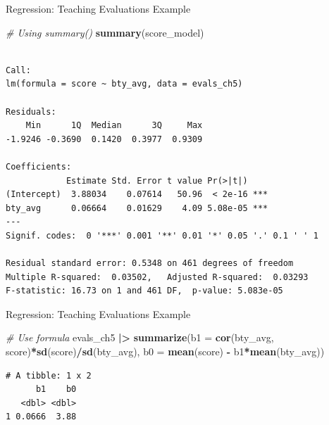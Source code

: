 \documentclass[
  ignorenonframetext,
]{beamer}
\newenvironment{Shaded}{\begin{snugshade}}{\end{snugshade}}
\newcommand{\AttributeTok}[1]{\textcolor[rgb]{0.13,0.29,0.53}{#1}}
\newcommand{\CommentTok}[1]{\textcolor[rgb]{0.56,0.35,0.01}{\textit{#1}}}
\newcommand{\FunctionTok}[1]{\textcolor[rgb]{0.13,0.29,0.53}{\textbf{#1}}}
\newcommand{\NormalTok}[1]{#1}
\newcommand{\SpecialCharTok}[1]{\textcolor[rgb]{0.81,0.36,0.00}{\textbf{#1}}}
\begin{document}
\begin{frame}[fragile]{Regression: Teaching Evaluations Example}
\protect{}\label{regression-teaching-evaluations-example-3}
\small

\begin{Shaded}
\begin{Highlighting}[]
\CommentTok{\# Using summary()}
\FunctionTok{summary}\NormalTok{(score\_model)}
\end{Highlighting}
\end{Shaded}

\begin{verbatim}

Call:
lm(formula = score ~ bty_avg, data = evals_ch5)

Residuals:
    Min      1Q  Median      3Q     Max 
-1.9246 -0.3690  0.1420  0.3977  0.9309 

Coefficients:
            Estimate Std. Error t value Pr(>|t|)    
(Intercept)  3.88034    0.07614   50.96  < 2e-16 ***
bty_avg      0.06664    0.01629    4.09 5.08e-05 ***
---
Signif. codes:  0 '***' 0.001 '**' 0.01 '*' 0.05 '.' 0.1 ' ' 1

Residual standard error: 0.5348 on 461 degrees of freedom
Multiple R-squared:  0.03502,   Adjusted R-squared:  0.03293 
F-statistic: 16.73 on 1 and 461 DF,  p-value: 5.083e-05
\end{verbatim}
\end{frame}

\begin{frame}[fragile]{Regression: Teaching Evaluations Example}
\protect{}\label{regression-teaching-evaluations-example-4}
\small

\begin{Shaded}
\begin{Highlighting}[]
\CommentTok{\# Use formula}
\NormalTok{evals\_ch5 }\SpecialCharTok{|\textgreater{}} 
  \FunctionTok{summarize}\NormalTok{(}\AttributeTok{b1 =} \FunctionTok{cor}\NormalTok{(bty\_avg, score)}\SpecialCharTok{*}\FunctionTok{sd}\NormalTok{(score)}\SpecialCharTok{/}\FunctionTok{sd}\NormalTok{(bty\_avg),}
            \AttributeTok{b0 =} \FunctionTok{mean}\NormalTok{(score) }\SpecialCharTok{{-}}\NormalTok{ b1}\SpecialCharTok{*}\FunctionTok{mean}\NormalTok{(bty\_avg))}
\end{Highlighting}
\end{Shaded}

\begin{verbatim}
# A tibble: 1 x 2
      b1    b0
   <dbl> <dbl>
1 0.0666  3.88
\end{verbatim}
\end{frame}
\end{document}
